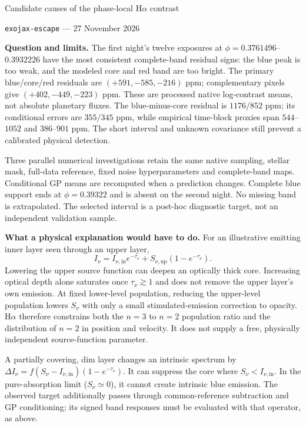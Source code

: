 \documentclass[10pt,a4paper]{article}
\begin{document}
\begin{center}
{\Large Candidate causes of the phase-local H$\alpha$ contrast}\par\vspace{4pt}
\texttt{exojax-escape} --- 27 November 2026
\end{center}

\textbf{Question and limits.}
The first night's twelve exposures at $\phi=0.3761496$--$0.3932226$ have the
most consistent complete-band residual signs: the blue peak is too weak,
and the modeled core and red band are too bright. The primary blue/core/red
residuals are $(+591,-585,-216)$ ppm; complementary pixels give
$(+402,-449,-223)$ ppm. These are processed native log-contrast means, not
absolute planetary fluxes. The blue-minus-core residual is $1176/852$ ppm;
its conditional errors are $355/345$ ppm, while empirical time-block
proxies span $544$--$1052$ and $386$--$901$ ppm. The short interval and unknown
covariance still prevent a calibrated physical detection.

Three parallel numerical investigations retain the same native sampling,
stellar mask, full-data reference, fixed noise hyperparameters and
complete-band maps. Conditional GP means are recomputed when a prediction
changes. Complete blue support ends at $\phi=0.39322$ and is absent on the
second night. No missing band is extrapolated. The selected interval is a
post-hoc diagnostic target, not an independent validation sample.



\clearpage
\textbf{What a physical explanation would have to do.}
For an illustrative emitting inner layer seen through an upper layer,
\[
 I_\nu=I_{\nu,\mathrm{in}}e^{-\tau_\nu}
       +S_{\nu,\mathrm{up}}(1-e^{-\tau_\nu}).
\]
Lowering the upper source function can deepen an optically thick core.
Increasing optical depth alone saturates once $\tau_\nu\gtrsim1$ and does
not remove the upper layer's own emission. At fixed lower-level population,
reducing the upper-level population lowers $S_\nu$ with only a small
stimulated-emission correction to opacity. H$\alpha$ therefore constrains
both the $n=3$ to $n=2$ population ratio and the distribution of $n=2$ in
position and velocity. It does not supply a free, physically independent
source-function parameter.

A partially covering, dim layer changes an intrinsic spectrum by
$\Delta I_\nu=f(S_\nu-I_{\nu,\mathrm{in}})(1-e^{-\tau_\nu})$.
It can suppress the core where $S_\nu<I_{\nu,\mathrm{in}}$. In the pure-absorption
limit ($S_\nu\simeq0$), it cannot create intrinsic blue emission.
The observed target additionally passes through
common-reference subtraction and GP conditioning; its signed band responses
must be evaluated with that operator, as above.
\end{document}
